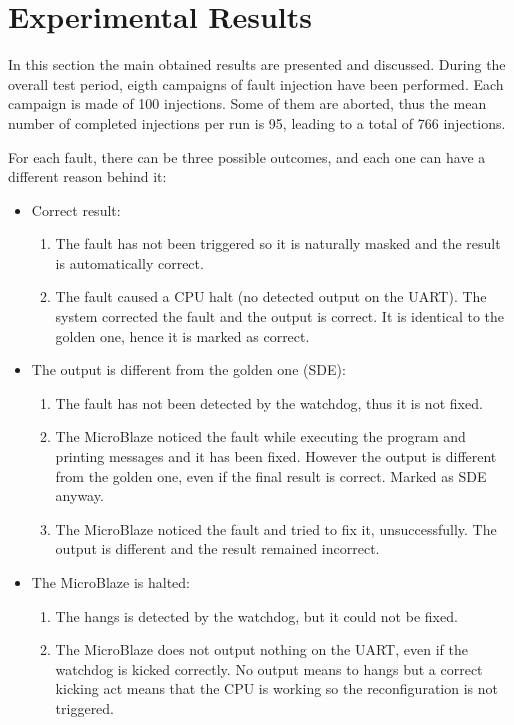 
\section{Experimental Results}

In this section the main obtained results are presented and discussed. During the overall test period, eigth campaigns of fault injection have been performed. Each campaign is made of 100 injections. Some of them are aborted, thus the mean number of completed injections per run is 95, leading to a total of 766 injections. \bigskip

For each fault, there can be three possible outcomes, and each one can have a different reason behind it:
\begin{itemize}
    \item Correct result:
    \begin{enumerate}
        \item The fault has not been triggered so it is naturally masked and the result is automatically correct.
        \item The fault caused a CPU halt (no detected output on the UART). The system corrected the fault and the output is correct. It is identical to the golden one, hence it is marked as correct.
    \end{enumerate}
    \item The output is different from the golden one (SDE):
    \begin{enumerate}
        \item The fault has not been detected by the watchdog, thus it is not fixed.
        \item The MicroBlaze noticed the fault while executing the program and printing messages and it has been fixed. However the output is different from the golden one, even if the final result is correct. Marked as SDE anyway.
        \item The MicroBlaze noticed the fault and tried to fix it, unsuccessfully. The output is different and the result remained incorrect.
    \end{enumerate}
    \item The MicroBlaze is halted:
    \begin{enumerate}
        \item The hangs is detected by the watchdog, but it could not be fixed.
        \item The MicroBlaze does not output nothing on the UART, even if the watchdog is kicked correctly. No output means to hangs but a correct kicking act means that the CPU is working so the reconfiguration is not triggered.
    \end{enumerate}
\end{itemize}

